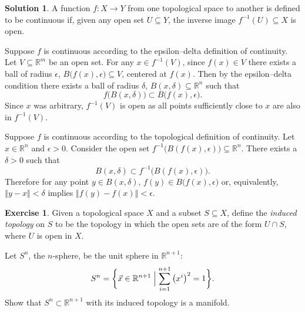 \documentclass[11pt, a4paper]{report}
\theoremstyle{definition}
\newtheorem{exercise}{Exercise}[part]
\newtheorem{solution}{Solution}[part]
\newenvironment{ex}{\begin{exercise}}{\end{exercise}\pagebreak[1]}
\newenvironment{sol}{\begin{solution}}{\end{solution}\pagebreak[3]}
\newcommand*{\norm}[1]{\ensuremath{\left\Vert#1\right\Vert}}
\begin{document}
\begin{sol}

A function $f: X \to Y$ from one topological space to another is defined to be continuous if, given any open set $U \subseteq Y$, the inverse image $f^{-1}(U) \subseteq X$ is open.

Suppose $f$ is continuous according to the epsilon--delta definition of continuity.
Let $V \subseteq \mathbb{R}^m$ be an open set.
For any $x \in f^{-1}(V)$, since $f(x) \in V$ there exists a ball of radius $\epsilon$, $B \bigl( f(x), \epsilon \bigr) \subseteq V$, centered at $f(x)$.
Then by the epsilon--delta condition there exists a ball of radius $\delta$, $B(x, \delta) \subseteq \mathbb{R}^n$ such that
\[
    f \bigl( B(x, \delta) \bigr) \subset B \bigl( f(x), \epsilon \bigr).
\]
Since $x$ was arbitrary, $f^{-1}(V)$ is open as all points sufficiently close to $x$ are also in $f^{-1}(V)$.

Suppose $f$ is continuous according to the topological definition of continuity.
Let $x \in \mathbb{R}^n$ and $\epsilon > 0$.
Consider the open set $f^{-1} \bigl( B(f(x), \epsilon) \bigr) \subseteq \mathbb{R}^n$.
There exists a $\delta > 0$ such that
\[
    B(x, \delta) \subset f^{-1} \bigl( B(f(x), \epsilon) \bigr).
\]
Therefore for any point $y \in B(x,\delta)$, $f(y) \in B \bigl( f(x), \epsilon \bigr)$ or, equivalently, $\norm{y - x} < \delta$ implies $\norm{f(y) - f(x)} < \epsilon$.

\end{sol}

\begin{ex}

Given a topological space $X$ and a subset $S \subseteq X$, define the \emph{induced topology} on $S$ to be the topology in which the open sets are of the form $U \cap S$, where $U$ is open in $X$.

Let $S^n$, the $n$-sphere, be the unit sphere in $\mathbb{R}^{n + 1}$:
\[
    S^n = \biggl\{\vec{x} \in \mathbb{R}^{n + 1} \Bigm| \sum_{i = 1}^{n + 1} {\bigl(x^i\bigr)}^2 = 1 \biggr\}.
\]
Show that $S^n \subset \mathbb{R}^{n + 1}$ with its induced topology is a manifold.

\end{ex}
\end{document}
